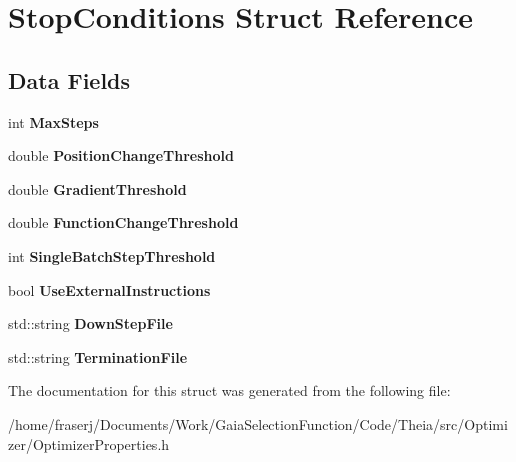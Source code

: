 \hypertarget{structStopConditions}{}\section{Stop\+Conditions Struct Reference}
\label{structStopConditions}
\subsection*{Data Fields}
\begin{DoxyCompactItemize}
\item 
\mbox{\label{structStopConditions_af2622385130b911bed2c486ae8c460ff}} 
int {\bfseries Max\+Steps}
\item 
\mbox{\label{structStopConditions_a43d87fc57a46592e5ebe7eb74ed0cf9f}} 
double {\bfseries Position\+Change\+Threshold}
\item 
\mbox{\label{structStopConditions_a8b6e6f9c935df6006ded3a0879dd33de}} 
double {\bfseries Gradient\+Threshold}
\item 
\mbox{\label{structStopConditions_adc5c6c3a77f1d2162419ba06dbfa6b03}} 
double {\bfseries Function\+Change\+Threshold}
\item 
\mbox{\label{structStopConditions_af78938739bfb3fc5971b9cbb4e61331d}} 
int {\bfseries Single\+Batch\+Step\+Threshold}
\item 
\mbox{\label{structStopConditions_a4b1bfd27c0581edec18fe55ae1cdced3}} 
bool {\bfseries Use\+External\+Instructions}
\item 
\mbox{\label{structStopConditions_ac32b60d59dd9c352b5dccc54d817eb6a}} 
std\+::string {\bfseries Down\+Step\+File}
\item 
\mbox{\label{structStopConditions_ae590bf77b1deeee760750df2a11fa6d8}} 
std\+::string {\bfseries Termination\+File}
\end{DoxyCompactItemize}


The documentation for this struct was generated from the following file\+:\begin{DoxyCompactItemize}
\item 
/home/fraserj/\+Documents/\+Work/\+Gaia\+Selection\+Function/\+Code/\+Theia/src/\+Optimizer/Optimizer\+Properties.\+h\end{DoxyCompactItemize}
